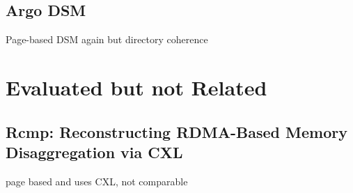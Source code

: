 \documentclass[sigplan,nonacm]{acmart}
\begin{document}
\subsection{Argo DSM}
Page-based DSM again but directory coherence




\section{Evaluated but not Related}
\subsection{Rcmp: Reconstructing RDMA-Based Memory Disaggregation via CXL}
page based and uses CXL, not comparable\cite{Wang-ACO-2024}




\end{document}
